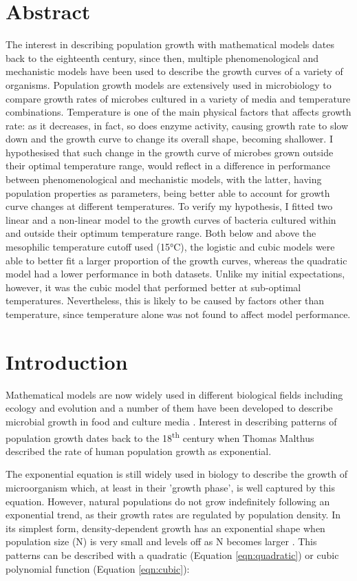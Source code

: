 \documentclass[a4paper]{article}
\begin{document}
\section{Abstract}
The interest in describing population growth with mathematical models dates back to the eighteenth century, since then, multiple phenomenological and mechanistic models have been used to describe the growth curves of a variety of organisms. Population growth models are extensively used in microbiology to compare growth rates of microbes cultured in a variety of media and temperature combinations. Temperature is one of the main physical factors that affects growth rate: as it decreases, in fact, so does enzyme activity, causing growth rate to slow down and the growth curve to change its overall shape, becoming shallower. I hypothesised that such change in the growth curve of microbes grown outside their optimal temperature range, would reflect in a difference in performance between phenomenological and mechanistic models, with the latter, having population properties as parameters, being better able to account for growth curve changes at different temperatures. To verify my hypothesis, I fitted two linear and a non-linear model to the growth curves of bacteria cultured within and outside their optimum temperature range. Both below and above the mesophilic temperature cutoff used (15°C), the logistic and cubic models were able to better fit a larger proportion of the growth curves, whereas the quadratic model had a lower performance in both datasets. Unlike my initial expectations, however, it was the cubic model that performed better at sub-optimal temperatures. Nevertheless, this is likely to be caused by factors other than temperature, since temperature alone was not found to affect model performance.

\pagebreak

\section{Introduction}
Mathematical models are now widely used in different biological fields including ecology and evolution \citep{johnson2004model} and a number of them have been developed to describe microbial growth in food and culture media \citep{Fujikawa2004ANL}. Interest in describing patterns of population growth dates back to the 18\textsuperscript{th} century when Thomas Malthus described the rate of human population growth as exponential.\par
The exponential equation is still widely used in biology to describe the growth of microorganism which, at least in their 'growth phase', is well captured by this equation. However, natural populations do not grow indefinitely following an exponential trend, as their growth rates are regulated by population density. In its simplest form, density-dependent growth has an exponential shape when population size (N) is very small and levels off as N becomes larger \citep{HASTINGS2013175}. This patterns can be described with a quadratic (Equation \ref{eqn:quadratic})  or cubic polynomial function (Equation \ref{eqn:cubic}):
\end{document}

